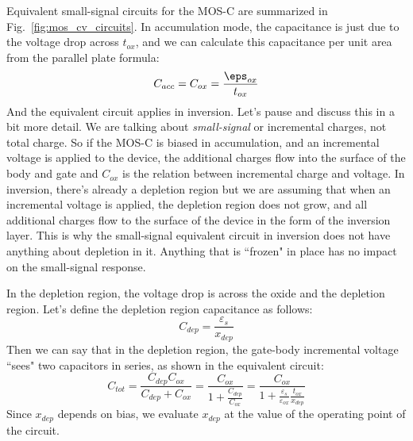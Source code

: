 Equivalent small-signal circuits for the MOS-C are summarized in Fig.~\ref{fig:mos_cv_circuits}.   In accumulation mode, the capacitance is just due to the voltage drop across $t_{ox}$, and we can calculate this capacitance per unit area from the parallel plate formula:
\begin{equation}
	C_{acc} = C_{ox} = \frac{\eps_{ox}}{t_{ox}}
\end{equation}
And the equivalent circuit applies in inversion.  Let's pause and discuss this in a bit more detail.  We are talking about \emph{small-signal} or incremental charges, not total charge.   So if the MOS-C is biased in accumulation, and an incremental voltage is applied to the device, the additional charges flow into the surface of the body and gate and $C_{ox}$ is the relation between incremental charge and voltage.  In inversion, there's already a depletion region but we are assuming that when an incremental voltage is applied, the depletion region does not grow, and all additional charges flow to the surface of the device in the form of the inversion layer. This is why the small-signal equivalent circuit in inversion does not have anything about depletion in it.  Anything that is ``frozen" in place has no impact on the small-signal response.

In the depletion region, the voltage drop is across the oxide and the depletion region.  Let's define the depletion region capacitance as follows:
\begin{equation}
	{C_{dep}} = \frac{{{\varepsilon _s}}}{{{x_{dep}}}}
\end{equation}
Then we can say that in the depletion region, the gate-body incremental voltage ``sees" two capacitors in series, as shown in the equivalent circuit:
\begin{equation}
{C_{tot}} = \frac{{{C_{dep}}{C_{ox}}}}{{{C_{dep}} + {C_{ox}}}} = \frac{{{C_{ox}}}}{{1 + \frac{{{C_{dep}}}}{{{C_{ox}}}}}} = \frac{{{C_{ox}}}}{{1 + \frac{{{\varepsilon _s}}}{{{\varepsilon _{ox}}}}\frac{{{t_{ox}}}}{{{x_{dep}}}}}}
\end{equation}
Since $x_{dep}$ depends on bias, we evaluate $x_{dep}$ at the value of the operating point of the circuit.  
